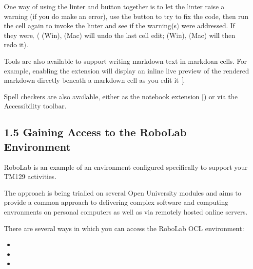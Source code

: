 \documentclass[letterpaper,10pt,english]{sphinxmanual}
\begin{document}
One way of using the  linter and  button together is to let the linter raise a warning (if you do make an error), use the button to try to fix the code, then run the cell again to invoke the linter and see if the warning(s) were addressed. If they were,  ( (Win),  (Mac) will undo the last cell edit;  (Win),  (Mac) will then redo it).

Tools are also available to support writing markdown text in markdoan cells. For example, enabling the  extension will display an inline live preview of the rendered markdown directly beneath a markdown cell as you edit it {[}\sphinxhref{/nbextensions/?nbextension=livemdpreview/livemdpreview}{direct link}{]}.

Spell checkers are also available, either as the  notebook extension {[}) or via the Accessibility toolbar.


\subsection{1.5 Gaining Access to the RoboLab Environment}
\label{\detokenize{content/00_READ_ME_FIRST/Section_00_05_Accessing_RoboLab:1.5-Gaining-Access-to-the-RoboLab-Environment}}\label{\detokenize{content/00_READ_ME_FIRST/Section_00_05_Accessing_RoboLab::doc}}
RoboLab is an example of an  environment configured specifically to support your TM129 activities.

The  approach is being trialled on several Open University modules and aims to provide a common approach to delivering complex software and computing envronments on personal computers as well as via remotely hosted online servers.

There are several ways in which you can access the RoboLab OCL environment:
\begin{itemize}
\item {} 

\item {} 

\item {} 

\end{itemize}
\end{document}
